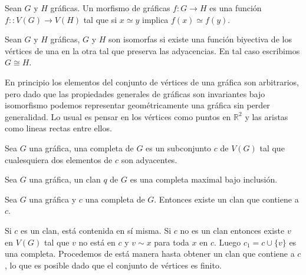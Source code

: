 \begin{Defi}
Sean $G$ y $H$ gráficas. Un morfismo de gráficas $f\colon G \rightarrow H$ es una función $f\colon: V(G)\rightarrow V(H)$ tal que si $x\simeq y$ implica $f(x)\simeq f(y)$.
\end{Defi}

\begin{Defi}[Isomorfismo]
Sean $G$ y $H$ gráficas, $G$ y $H$ son isomorfas si existe una función biyectiva de los vértices de una en la otra tal que preserva las adyacencias. En tal caso escribimos $G\cong H$.
\end{Defi}
En principio los elementos del conjunto de vértices de una gráfica son arbitrarios, pero dado que las propiedades generales de gráficas son invariantes bajo isomorfismo podemos representar geométricamente una gráfica sin perder generalidad. Lo usual es pensar en los vértices como puntos en $\mathbb{R}^2$ y las aristas como lineas rectas entre ellos.

\begin{Defi}[Completa]
Sea $G$ una gráfica, una completa de $G$ es un subconjunto $c$ de $V(G)$ tal que cualesquiera dos elementos de $c$ son adyacentes.
\end{Defi}

\begin{Defi}[Clan]
Sea $G$ una gráfica, un clan $q$ de $G$ es una completa maximal bajo inclusión.
\end{Defi}

\begin{Prop}
Sea $G$ una gráfica y $c$ una completa de $G$. Entonces existe un clan que contiene a $c$.
\end{Prop}
\begin{Dem}
Si $c$ es un clan, está contenida en sí misma. Si $c$ no es un clan entonces existe $v$ en $V(G)$ tal que $v$ no está en $c$ y $v\sim x$ para toda $x$ en $c$. 
Luego $c_1 = c\cup \{v\}$ es una completa. 
Procedemos de está manera hasta obtener un clan que contiene a $c$, lo que es posible dado que el conjunto de vértices es finito.  
\end{Dem}

